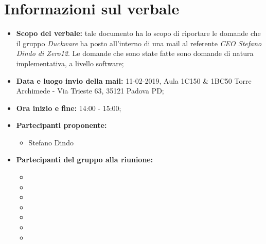 \clearpage
\section{Informazioni sul verbale}
\begin{itemize}
	\item \textbf {Scopo del verbale:} tale documento ha lo scopo di riportare le domande che il gruppo \emph{Duckware} ha posto all'interno di una mail al referente \emph{CEO Stefano Dindo di Zero12}. Le domande che sono state fatte sono domande di natura implementativa, a livello software;
	\item \textbf {Data e luogo invio della mail:} 11-02-2019, Aula 1C150 \& 1BC50 Torre Archimede - Via Trieste 63, 35121 Padova PD;
	\item \textbf {Ora inizio e fine:} 14:00 - 15:00;
	\item \textbf {Partecipanti proponente:} 
		\begin{itemize}
			\item Stefano Dindo
		\end{itemize}
	\item \textbf {Partecipanti del gruppo alla riunione:} 
		 \begin{itemize}
			\item \sonia
			\item \luca
			\item \matteo
			\item \pardeep
			\item \alberto
			\item \alessandro
			\item \andrea
		\end{itemize}
\end{itemize}